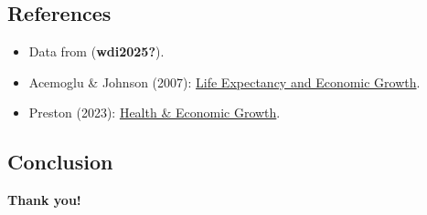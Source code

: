 \documentclass[
  letterpaper,
  DIV=11,
  numbers=noendperiod]{scrartcl}
\providecommand{\tightlist}{%
  \setlength{\itemsep}{0pt}\setlength{\parskip}{0pt}}\usepackage{longtable,booktabs,array}
\begin{document}
\subsection{References}\label{references}

\begin{itemize}
\tightlist
\item
  Data from (\textbf{wdi2025?}).
\item
  Acemoglu \& Johnson (2007):
  \href{https://eml.berkeley.edu/~webfac/cromer/e291_f06/Acemoglu.pdf}{Life
  Expectancy and Economic Growth}.
\item
  Preston (2023):
  \href{https://pmc.ncbi.nlm.nih.gov/articles/PMC11066381/}{Health \&
  Economic Growth}.
\end{itemize}

\subsection{Conclusion}\label{conclusion}

\textbf{Thank you!}
\end{document}
